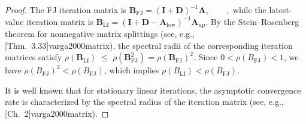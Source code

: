 \documentclass[sigconf,review, nonacm]{acmart}
\renewcommand\AA{\boldsymbol{\mathit{A}}}
\newcommand\BB{\boldsymbol{\mathit{B}}}
\newcommand\DD{\boldsymbol{\mathit{D}}}
\newcommand\II{\boldsymbol{\mathit{I}}}
\begin{document}
\begin{proof}
	The FJ iteration matrix is
	$\mathbf{B}_{\mathrm{FJ}} = (\mathbf{I}+\mathbf{D})^{-1}\mathbf{A},
	\qquad,$
	while the latest-value iteration matrix is
	$\mathbf{B}_{\mathrm{LI}} = (\mathbf{I}+\mathbf{D}-\mathbf{A}_{\mathrm{low}})^{-1}\mathbf{A}_{\mathrm{up}}.$
	By the Stein--Rosenberg theorem for nonnegative matrix splittings (see, e.g., [Thm.~3.33]{varga2000matrix}), the spectral radii of the corresponding iteration matrices satisfy
	$
	\rho(\mathbf{B}_{\mathrm{LI}})
	\;\le\;
	\rho(\mathbf{B}_{\mathrm{FJ}}^{2})
	=
	\rho(\mathbf{B}_{\mathrm{FJ}})^{2}.
	$
	Since $0<\rho(\BB_{\mathrm{FJ}})<1$, we have
	$\rho(\BB_{\mathrm{FJ}})^{2} < \rho(\BB_{\mathrm{FJ}})$,
	which implies
	$\rho(\BB_{\mathrm{LI}}) < \rho(\BB_{\mathrm{FJ}}).$
	
	It is well known that for stationary linear iterations,
	the asymptotic convergence rate is characterized by the spectral radius
	of the iteration matrix (see, e.g.,[Ch.~2]{varga2000matrix}).
	
\end{proof}


%	
%	
%	
\end{document}
